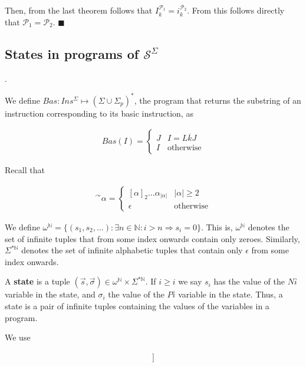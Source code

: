 \documentclass[a4paper, 12pt]{article}
\begin{document}
Then, from the last theorem follows that $I_k^{\mathcal{P}_1} =
i_k^{\mathcal{P}_2}$. From this follows directly that $\mathcal{P}_1 =
\mathcal{P}_2$. $\blacksquare$

\subsection{States in programs of $\mathcal{S}^{\Sigma}$}.

We define $Bas : Ins^{\Sigma} \mapsto (\Sigma \cup \Sigma_p)^{*}$, the program
that returns the substring of an instruction corresponding to its basic
instruction, as 

\begin{align*}
    Bas(I) = \begin{cases}
        J & I = L \overline{k} J \\ 
        I & \text{otherwise}
    \end{cases}
\end{align*}

Recall that 

\begin{align*}
    {}^{\curvearrowright} \alpha = \begin{cases}
        [\alpha]_2 \ldots \alpha_|\alpha| & |\alpha| \geq 2 \\ 
        \epsilon & \text{otherwise}
    \end{cases}
\end{align*}

We define $\omega^{\mathbb{N}} = \{ (s_1, s_2, \ldots) : \exists n \in
\mathbb{N} : i > n \Rightarrow s_i = 0 \}$. This is, $\omega^{\mathbb{N}}$
denotes the set of infinite tuples that from some index onwards contain only
zeroes. Similarly, $\Sigma^{*\mathbb{N}}$ denotes the set of infinite alphabetic
tuples that contain only $\epsilon$ from some index onwards.

A \textbf{state} is a tuple $(\overrightarrow{s}, \overrightarrow{\sigma}) \in
\omega^{\mathbb{N}} \times \Sigma^{*\mathbb{N}}$. If $i \geq i$ we say $s_i$ has
the value of the ${N} \overline{i}$ variable in the state, and $\sigma_i$ the
value of the $P \overline{i}$ variable in the state. Thus, a state is a pair of
infinite tuples containing the values of the variables in a program.

We use 

\begin{align*}
    [\![ x_1, \ldots x_n, ~ \alpha_1, \ldots, \alpha_m ]\!]
\end{align*}
\end{document}
